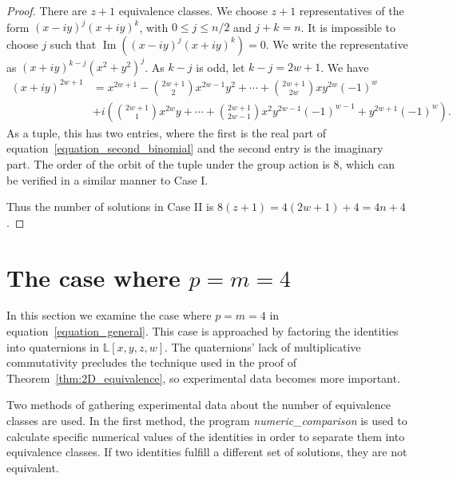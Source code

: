 \documentclass[12pt,table]{article}
\theoremstyle{definition}
\theoremstyle{remark}
\newcommand{\Lll}{\mathbb L}
\newcommand{\myfrac}[2]{#1 / #2}
\numberwithin{equation}{section}
\DeclareMathOperator{\Imag}{Im}
\begin{document}
\begin{proof}
There are $ z + 1 $ equivalence classes. We choose $ z + 1 $
representatives of the form $ (x - iy)^j (x + iy)^k $, with
$ 0 \leq j \leq \myfrac{n}{2}$ and $ j + k = n $.
It is impossible to
choose $ j $ such that $ \Imag\left( (x - iy)^j (x + iy)^k \right) = 0$.
We write the representative as $ (x + iy)^{k-j} (x^2 + y^2)^j $.
As $ k - j $ is odd, let $ k - j = 2w + 1 $. We have
\begin{align}
\label{equation_second_binomial}
(x + iy) ^ {2w + 1} &= x ^ {2w + 1} - \binom{2w+1}{2}  x^{2w - 1 } y^2
+ \dotsb + \binom{2w+1}{2w} x y^{2w} (-1) ^ {w} \nonumber
\\
&+ i \left( \binom{2w+1}{1} x ^ {2w} y + \dotsb +
\binom{2w+1}{2w-1}  x^2 y ^ {2w -1} (-1)^{w-1}
+  y^{2w+1} (-1) ^ {w}
\right).
\end{align}
As a tuple, this has two entries, where the first is the real part
of equation~\eqref{equation_second_binomial} and the second entry
is the imaginary part.
The order of the orbit of the tuple under the group action is 8, which can be
verified in a similar manner to Case I.

Thus the number of solutions in Case II is $ 8(z + 1) = 4 ( 2w + 1) + 4 = 4n + 4 $.
\end{proof}




\section{The case where $p = m = 4$}
\label{sec:4D}

In this section we examine the case where
$p = m = 4$ in equation~\eqref{equation_general}.
This case is approached by factoring the identities
into quaternions in $\Lll[x,y,z,w]$. The quaternions'
lack of multiplicative commutativity precludes the 
technique used in the proof of Theorem~\ref{thm:2D_equivalence},
so experimental data becomes more important.


Two methods of gathering experimental data about the 
number of equivalence classes are used. 
In the first method,
the program \emph{numeric\_comparison}
is used to calculate specific numerical values of 
the identities in order to 
separate them into equivalence classes.
If two identities fulfill
a different set of solutions, they are
not equivalent.
\end{document}
